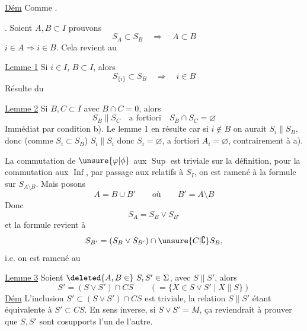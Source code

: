 
\uline{Dém} Comme .

. Soient $A,B\subset I$  prouvons
\[
S_A\subset S_B\quad\Rightarrow\quad A\subset B
\]
 $i\in A\Rightarrow i\in B$. Cela revient au 

\uline{Lemme 1} Si $i\in I$,  $B\subset I$, alors
\[
S_{\{i\}}\subset S_B\quad\Rightarrow\quad i\in B
\]
Résulte du

\uline{Lemme 2} Si  $B,C\subset I$ avec $B\cap C=0$, alors
\[
S_B\parallel S_C\quad\text{a fortiori}\quad S_B\cap S_C=\varnothing
\]
Immédiat par condition b). Le lemme 1 en résulte car si $i\notin B$ on aurait $S_i\parallel S_B$, donc (comme $S_i\subset S_B$) $S_i\parallel S_i$ donc $S_i=\varnothing$, a fortiori $A_i=\varnothing$, contrairement à a).

La commutation de $\unsure{\varphi|\phi}$ aux $\operatorname{Sup}$ est triviale sur la définition, pour la commutation aux $\operatorname{Inf}$, par passage aux  relatifs  à $S_I$, on est ramené à la formule sur $S_{A\setminus B}$. Mais posons
\[
A=B\cup B'\qquad\text{où}\qquad B'=A\setminus B
\]
Donc
\[
S_A=S_B\vee S_{B'}
\]
et la formule revient à
\[
S_{B'}=(S_B\vee S_{B'})\cap\unsure{C|\complement}S_B,
\]
i.e. on est ramené au

\uline{Lemme 3} Soient $\deleted{A,B\in}\ S,S'\in\Sigma$, avec $S\parallel S'$, alors
\[
S'=(S\vee S')\cap CS\qquad(=\{X\in S\vee S'\mid X\parallel S\})
\]
\uline{Dém} L'inclusion $S'\subset(S\vee S')\cap CS$ est triviale, la relation $S\parallel S'$ étant équivalente à $S'\subset CS$.
En sens inverse, si $S\vee S'=M$, ça reviendrait à prouver que $S,S'$ sont cosupports l'un de l'autre.
